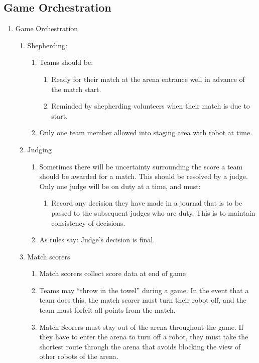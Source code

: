 \subsection{Game Orchestration}
\begin{enumerate}
\item Game Orchestration
  \begin{enumerate}
  \item Shepherding:
    \begin{enumerate}
    \item Teams should be:
      \begin{enumerate}
      \item Ready for their match at the arena entrance well in advance of the match start.
      \item Reminded by shepherding volunteers when their match is due to start.
      \end{enumerate}

    \item Only one team member allowed into staging area with robot at time.
    \end{enumerate}

  \item Judging
    \begin{enumerate}
    \item Sometimes there will be uncertainty surrounding the score a team should be awarded for a match.  This should be resolved by a judge.  Only one judge will be on duty at a time, and must:
      \begin{enumerate}
      \item Record any decision they have made in a journal that is to be passed to the subsequent judges who are duty.  This is to maintain consistency of decisions.
      \end{enumerate}
    \item As rules say: Judge's decision is final.
    \end{enumerate}

  \item Match scorers
    \begin{enumerate}
    \item Match scorers collect score data at end of game
    \item Teams may ``throw in the towel'' during a game.  In the event that a team does this, the match scorer must turn their robot off, and the team must forfeit all points from the match.
    \item Match Scorers must stay out of the arena throughout the game.  If they have to enter the arena to turn off a robot, they must take the shortest route through the arena that avoids blocking the view of other robots of the arena.
    \end{enumerate}


\end{enumerate}
\end{enumerate}
